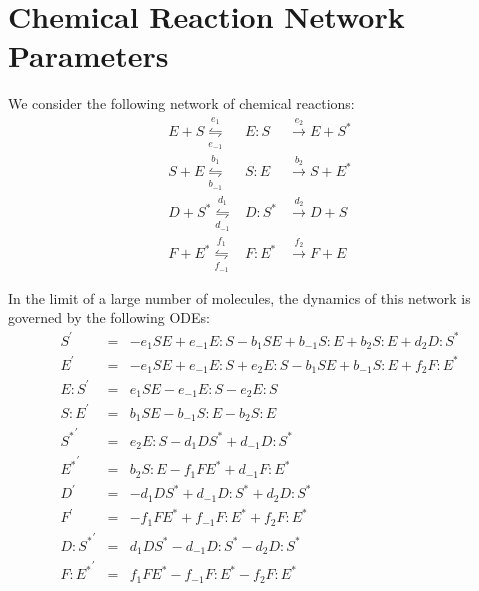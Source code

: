 \documentclass[aip,jcp,preprint]{revtex4-1}
\begin{document}


\appendix

\section{Chemical Reaction Network Parameters} \label{app:rxn}

We consider the following network of chemical reactions:
\begin{equation}
\begin{array}{rcl}
E + S \overset{e_1}{\underset{e_{-1}}{\leftrightharpoons}} & E:S & \overset{e_2}{\rightarrow} E + S^{*} \\
S + E \overset{b_1}{\underset{b_{-1}}{\leftrightharpoons}} & S:E & \overset{b_2}{\rightarrow} S + E^{*}\\
D + S^{*} \overset{d_1}{\underset{d_{-1}}{\leftrightharpoons}} & D:S^{*} & \overset{d_2}{\rightarrow} D + S\\
F + E^{*} \overset{f_1}{\underset{f_{-1}}{\leftrightharpoons}} & F:E^{*} & \overset{f_2}{\rightarrow} F + E
\end{array}
\end{equation}

\begin{widetext}
In the limit of a large number of molecules, the dynamics of this network is governed by the following ODEs:
\begin{equation}
    \begin{array}{rcl}
        S^\prime & = & -e_1 S E + e_{-1} E:S -b_1 S E + b_{-1} S:E + b_2 S:E + d_2 D:S^{*} \\
        E^\prime & = & -e_1 S E + e_{-1} E:S + e_2 E:S - b_1 S E +b_{-1} S:E + f_2 F:E^{*} \\
        E:S^\prime & = & e_1 S E -e_{-1} E:S -e_2 E:S \\
        S:E^\prime & = & b_1 S E -b_{-1} S:E -b_2 S:E \\
        {S^{*}}^\prime & = & e_2 E:S -d_1 D S^{*} + d_{-1} D:S^{*} \\
        {E^{*}}^\prime & = & b_2 S:E -f_1 F E^{*} + d_{-1} F:E^{*} \\
        D^\prime & = & -d_1 D S^{*} + d_{-1} D:S^{*} + d_2 D:S^{*} \\
        F^\prime & = & -f_1 F E^{*} + f_{-1} F:E^{*} + f_2 F:E^{*} \\
        {D:S^{*}}^\prime & = & d_1 D S^{*} - d_{-1} D:S^{*} -d_2 D:S^{*} \\
        {F:E^{*}}^\prime & = & f_1 FE^{*} - f_{-1} F:E^{*} -f_2 F:E^{*}
    \end{array}
\end{equation}
\end{widetext}
\end{document}

